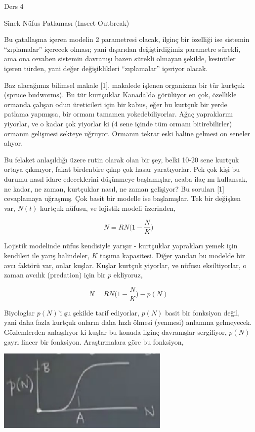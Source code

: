 \documentclass[12pt,fleqn]{article}\usepackage{../../common}
\begin{document}
Ders 4

Sinek Nüfus Patlaması (Insect Outbreak)

Bu çatallaşma içeren modelin 2 parametresi olacak, ilginç bir özelliği ise
sistemin ``zıplamalar'' içerecek olması; yani dışarıdan değiştirdiğimiz
parametre sürekli, ama ona cevaben sistemin davranışı bazen sürekli olmayan
şekilde, kesintiler içeren türden, yani değer değişiklikleri ``zıplamalar''
içeriyor olacak.

Baz alacağımız bilimsel makale [1], makalede işlenen organizma bir tür kurtçuk
(spruce budworms). Bu tür kurtçuklar Kanada'da görülüyor en çok, özellikle
ormanda çalışan odun üreticileri için bir kabus, eğer bu kurtçuk bir yerde
patlama yapmışsa, bir ormanı tamamen yokedebiliyorlar. Ağaç yapraklarını
yiyorlar, ve o kadar çok yiyorlar ki (4 sene içinde tüm ormanı bitirebilirler)
ormanın gelişmesi sekteye uğruyor. Ormanın tekrar eski haline gelmesi on seneler
alıyor.

Bu felaket anlaşıldığı üzere rutin olarak olan bir şey, belki 10-20 sene kurtçuk
ortaya çıkmıyor, fakat birdenbire çıkıp çok hasar yaratıyorlar. Pek çok kişi bu
durumu nasıl idare edeceklerini düşünmeye başlamışlar, acaba ilaç mı kullansak,
ne kadar, ne zaman, kurtçuklar nasıl, ne zaman gelişiyor? Bu soruları [1]
cevaplamaya uğraşmış. Çok basit bir modelle ise başlamışlar. Tek bir değişken
var, $N(t)$ kurtçuk nüfusu, ve lojistik modeli üzerinden,

$$ \dot{N} = RN \big(1-\frac{N}{K}\big)  $$

Lojistik modelinde nüfus kendisiyle yarışır - kurtçuklar yaprakları yemek için
kendileri ile yarış halindeler, $K$ taşıma kapasitesi. Diğer yandan bu modelde
bir avcı faktörü var, onlar kuşlar. Kuşlar kurtçuk yiyorlar, ve nüfusu
eksiltiyorlar, o zaman avcılık (predation) için bir $p$ ekliyoruz,

$$ \dot{N} = RN \big(1-\frac{N}{K}\big) - p(N) $$

Biyologlar $p(N)$'i şu şekilde tarif ediyorlar, $p(N)$ basit bir fonksiyon
değil, yani daha fazla kurtçuk onların daha hızlı ölmesi (yenmesi) anlamına
gelmeyecek. Gözlemlerden anlaşılıyor ki kuşlar bu konuda ilginç davranışlar
sergiliyor, $p(N)$ gayrı lineer bir fonksiyon. Araştırmalara göre bu fonksiyon,

\includegraphics[height=4cm]{04_01.png}
\end{document}
